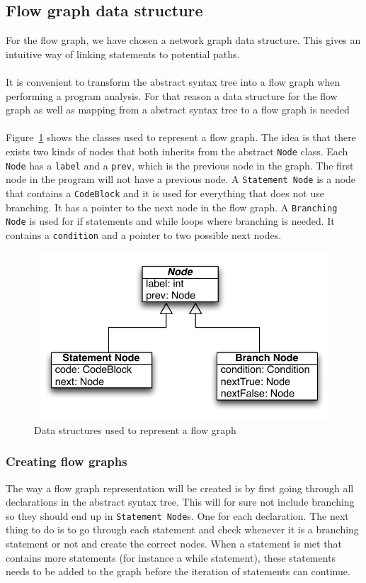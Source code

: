 \subsection{Flow graph data structure}
For the flow graph, we have chosen a network graph data structure. This gives an intuitive way of linking statements to potential paths.
\\
\\
It is convenient to transform the abstract syntax tree into a flow graph when performing a program analysis. For that reason a data structure for the flow graph as well as mapping from a abstract syntax tree to a flow graph is needed 
\\
\\
Figure~\ref{fig:flowgraph} shows the classes used to represent a flow graph. The idea is that there exists two kinds of nodes that both inherits from the abstract \texttt{Node} class. Each \texttt{Node} has a \texttt{label} and a \texttt{prev}, which is the previous node in the graph. The first node in the program will not have a previous node. A \texttt{Statement Node} is a node that contains a \texttt{CodeBlock} and it is used for everything that does not use branching. It has a pointer to the next node in the flow graph. A \texttt{Branching Node} is used for if statements and while loops where branching is needed. It contains a \texttt{condition} and a pointer to two possible next nodes.

\begin{figure}[h]
	\centering
	\includegraphics[scale=1.0]{../img/flow_graph}
	\caption{Data structures used to represent a flow graph}
	\label{fig:flowgraph}
\end{figure}

\subsubsection{Creating flow graphs}
The way a flow graph representation will be created is by first going through all declarations in the abstract syntax tree. This will for sure not include branching so they should end up in \texttt{Statement Node}s. One for each declaration. The next thing to do is to go through each statement and check whenever it is a branching statement or not and create the correct nodes. When a statement is met that contains more statements (for instance a while statement), these statements needs to be added to the graph before the iteration of statements can continue.


